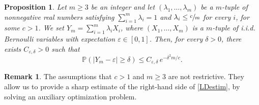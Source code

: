 \documentclass[JEP,XML,SOM,Unicode, NoEqCountersInSection,NoFloatCountersInSection,published]{cedram}
\newtheorem{proposition}{Proposition}
\theoremstyle{definition}
\newtheorem{remark}{Remark}
\begin{document}
\begin{proposition}\label{prop:largeDev}
Let $m \geq 3$ be an integer and let $(\lambda_1,\ldots,\lambda_m)$ be a $m$-tuple of nonnegative real numbers satisfying $\sum_{i=1}^m \lambda_i = 1$ and $\lambda_i \leq \sfrac{c}{m}$ for every $i$, for some $c>1$.
We set $Y_m = \sum_{i=1}^m \lambda_{i} X_i$, where $(X_1,\ldots,X_m)$ is a $m$-tuple of i.i.d. Bernoulli variables with expectation $\varepsilon \in [0,1]$.
Then, for every $\delta >0$, there exists $C_{\varepsilon,\delta}>0$ such that
\begin{equation}\label{LDestim}
\mathbb{P}( |Y_m - \varepsilon| \geq \delta) \leq C_{\varepsilon, \delta} \, e^{-\delta^2 m/c }.
\end{equation}
\end{proposition}

\begin{remark}
The assumptions that $c>1$ and $m\geq 3$ are not restrictive. They allow us to provide a sharp estimate of the right-hand side of \eqref{LDestim}, by solving an auxiliary optimization problem.
\end{remark}
\end{document}

